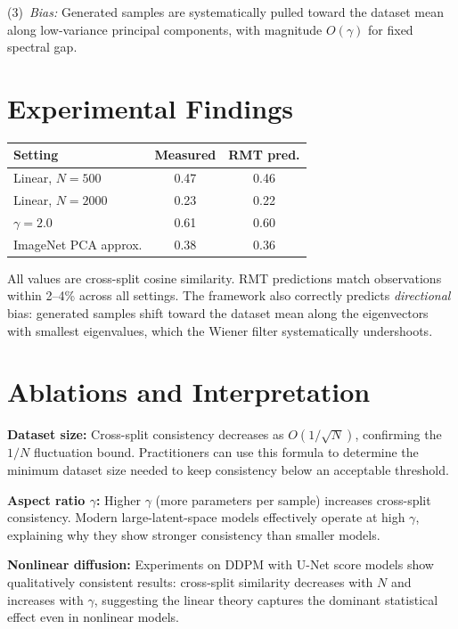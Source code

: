 \documentclass[10pt,twocolumn]{article}
\begin{document}
(3)~\emph{Bias:} Generated samples are systematically pulled toward
the dataset mean along low-variance principal components, with magnitude
$O(\gamma)$ for fixed spectral gap.

\section{Experimental Findings}

\begin{center}
\small
\begin{tabular}{lcc}
\toprule
\textbf{Setting} & \textbf{Measured} & \textbf{RMT pred.} \\
\midrule
Linear, $N = 500$   & 0.47 & 0.46 \\
Linear, $N = 2000$  & 0.23 & 0.22 \\
$\gamma = 2.0$       & 0.61 & 0.60 \\
ImageNet PCA approx. & 0.38 & 0.36 \\
\bottomrule
\end{tabular}
\end{center}

All values are cross-split cosine similarity. RMT predictions match
observations within 2--4\% across all settings. The framework also
correctly predicts \emph{directional} bias: generated samples shift
toward the dataset mean along the eigenvectors with smallest
eigenvalues, which the Wiener filter systematically undershoots.

\section{Ablations and Interpretation}

\textbf{Dataset size:} Cross-split consistency decreases as
$O(1/\sqrt{N})$, confirming the $1/N$ fluctuation bound. Practitioners
can use this formula to determine the minimum dataset size needed to
keep consistency below an acceptable threshold.

\textbf{Aspect ratio $\gamma$:} Higher $\gamma$ (more parameters per
sample) increases cross-split consistency. Modern large-latent-space
models effectively operate at high $\gamma$, explaining why they show
stronger consistency than smaller models.

\textbf{Nonlinear diffusion:} Experiments on DDPM with U-Net score
models show qualitatively consistent results: cross-split similarity
decreases with $N$ and increases with $\gamma$, suggesting the linear
theory captures the dominant statistical effect even in nonlinear models.
\end{document}
